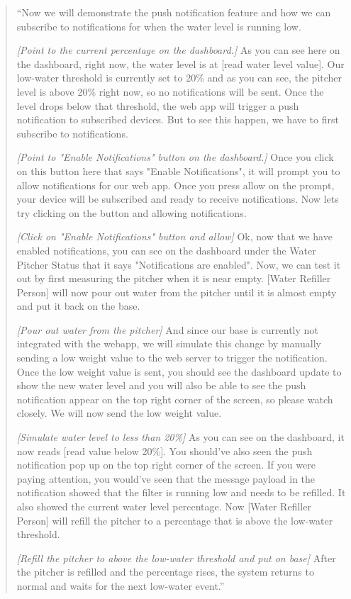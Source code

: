 \documentclass[12pt]{article}
\begin{document}
\begin{quote}
``Now we will demonstrate the push notification feature and how we can subscribe to notifications for when the water level is running low.

\textit{[Point to the current percentage on the dashboard.]}
As you can see here on the dashboard, right now, the water level is at [read water level value]. Our low-water threshold is currently set to 20\% and as you can see, the pitcher level is above 20\% right now, so no notifications will be sent. 
Once the level drops below that threshold, the web app will trigger a push notification to subscribed devices. But to see this happen, we have to first subscribe to notifications. 

\textit{[Point to "Enable Notifications" button on the dashboard.]} Once you click on this button here that says "Enable Notifications", it will prompt you to allow notifications for our web app. Once you press allow on the prompt, your device will be subscribed and ready to receive notifications.
Now lets try clicking on the button and allowing notifications.

\textit{[Click on "Enable Notifications" button and allow]} Ok, now that we have enabled notifications, you can see on the dashboard under the Water Pitcher Status that it says "Notifications are enabled".
Now, we can test it out by first measuring the pitcher when it is near empty. [Water Refiller Person] will now pour out water from the pitcher until it is almost empty and put it back on the base. 

\textit{[Pour out water from the pitcher]} And since our base is currently not integrated with the webapp, we will simulate this change by manually sending a low weight value to the web server to trigger the notification. Once the low weight value is sent, 
you should see the dashboard update to show the new water level and you will also be able to see the push notification appear on the top right corner of the screen, so please watch closely. We will now send the low weight value.

\textit{[Simulate water level to less than 20\%]} As you can see on the dashboard, it now reads [read value below 20\%]. You should've also seen the push notification pop up on the top right corner of the screen. If you were paying attention, you would've seen that the message payload in the notification 
showed that the filter is running low and needs to be refilled. It also showed the current water level percentage. Now [Water Refiller Person] will refill the pitcher to a percentage that is above the low-water threshold. 

\textit{[Refill the pitcher to above the low-water threshold and put on base]} After the pitcher is refilled and the percentage rises, the system returns to normal and waits for the next low-water event.''
\end{quote}
\end{document}

